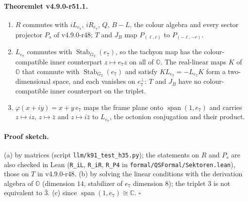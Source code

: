 \paragraph{Theoremlet v4.9.0-r51.1.}
\begin{enumerate}[leftmargin=2em]
\item[(a)] \(R\) commutes with \(iL_{e_7}\), \(iR_{e_7}\), \(Q\), \(B-L\), the colour algebra and every sector projector \(P_s\) of v4.9.0-r48;
\(T\) and \(J_B\) map \(P_{(\ell,r)}\) to \(P_{(-\ell,-r)}\).
\item[(b)] \(L_{e_7}\) commutes with \(\operatorname{Stab}_{G_2}(e_7)\), so the tachyon map has the colour-compatible inner counterpart
\(z\mapsto e_7z\) on all of \(\mathbb O\).  The real-linear maps \(K\) of \(\mathbb O\) that commute with \(\operatorname{Stab}_{G_2}(e_7)\) and
satisfy \(KL_{e_7}=-L_{e_7}K\) form a two-dimensional space, and each vanishes on \(e_7^\perp\): \(T\) and \(J_B\) have no colour-compatible
inner counterpart on the triplet.
\item[(c)] \(\varphi(x+iy)=x+y\,e_7\) maps the frame plane onto \(\operatorname{span}(1,e_7)\) and carries \(z\mapsto iz\), \(z\mapsto\bar z\) and
\(z\mapsto i\bar z\) to \(L_{e_7}\), the octonion conjugation and their product.
\end{enumerate}

\paragraph{Proof sketch.}
(a) by matrices (script \texttt{llm/k91\_test\_h35.py}); the statements on \(R\) and \(P_s\) are also checked in Lean (\texttt{R\_iL},
\texttt{R\_iR}, \texttt{R\_P4} in \texttt{formal/QSFormal/Sektoren.lean}), those on \(T\) in v4.9.0-r48.  (b) by solving the linear conditions
with the derivation algebra of \(\mathbb O\) (dimension \(14\), stabilizer of \(e_7\) dimension \(8\)); the triplet \(3\) is not equivalent to
\(\bar 3\).  (c) since \(\operatorname{span}(1,e_7)\cong\mathbb C\).  \(\square\)

